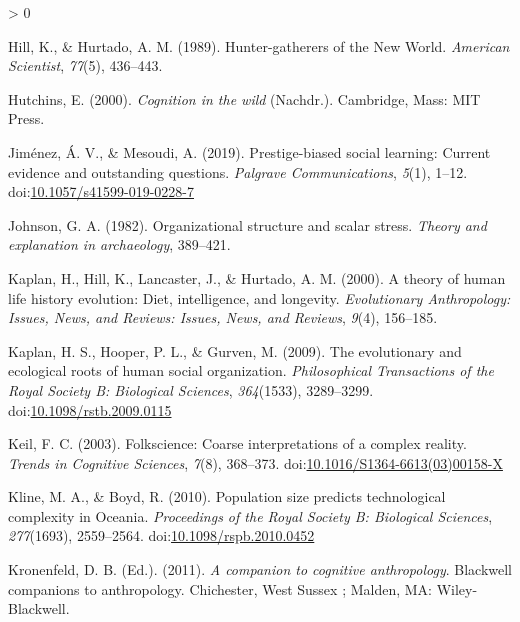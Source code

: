 \documentclass[
  11pt,
]{article}
\newlength{\cslhangindent}
\newenvironment{CSLReferences}[2] %
 {%
  \setlength{\parindent}{0pt}
  \ifodd #1 \everypar{\setlength{\hangindent}{\cslhangindent}}\ignorespaces\fi
  \ifnum #2 > 0
  \setlength{\parskip}{#2\baselineskip}
  \fi
 }%
 {}
\begin{document}
\begin{CSLReferences}{1}{0}
\leavevmode\hypertarget{ref-hillHuntergatherersNewWorld1989}{}%
Hill, K., \& Hurtado, A. M. (1989). Hunter-gatherers of the {New World}. \emph{American Scientist}, \emph{77}(5), 436--443.

\leavevmode\hypertarget{ref-hutchinsCognitionWild2000}{}%
Hutchins, E. (2000). \emph{Cognition in the wild} (Nachdr.). {Cambridge, Mass}: {MIT Press}.

\leavevmode\hypertarget{ref-jimenezPrestigebiasedSocialLearning2019}{}%
Jiménez, Á. V., \& Mesoudi, A. (2019). Prestige-biased social learning: Current evidence and outstanding questions. \emph{Palgrave Communications}, \emph{5}(1), 1--12. doi:\href{https://doi.org/10.1057/s41599-019-0228-7}{10.1057/s41599-019-0228-7}

\leavevmode\hypertarget{ref-johnson1982organizational}{}%
Johnson, G. A. (1982). Organizational structure and scalar stress. \emph{Theory and explanation in archaeology}, 389--421.

\leavevmode\hypertarget{ref-kaplanTheoryHumanLife2000}{}%
Kaplan, H., Hill, K., Lancaster, J., \& Hurtado, A. M. (2000). A theory of human life history evolution: {Diet}, intelligence, and longevity. \emph{Evolutionary Anthropology: Issues, News, and Reviews: Issues, News, and Reviews}, \emph{9}(4), 156--185.

\leavevmode\hypertarget{ref-kaplanEvolutionaryEcologicalRoots2009}{}%
Kaplan, H. S., Hooper, P. L., \& Gurven, M. (2009). The evolutionary and ecological roots of human social organization. \emph{Philosophical Transactions of the Royal Society B: Biological Sciences}, \emph{364}(1533), 3289--3299. doi:\href{https://doi.org/10.1098/rstb.2009.0115}{10.1098/rstb.2009.0115}

\leavevmode\hypertarget{ref-keilFolkscienceCoarseInterpretations2003}{}%
Keil, F. C. (2003). Folkscience: Coarse interpretations of a complex reality. \emph{Trends in Cognitive Sciences}, \emph{7}(8), 368--373. doi:\href{https://doi.org/10.1016/S1364-6613(03)00158-X}{10.1016/S1364-6613(03)00158-X}

\leavevmode\hypertarget{ref-klinePopulationSizePredicts2010}{}%
Kline, M. A., \& Boyd, R. (2010). Population size predicts technological complexity in {Oceania}. \emph{Proceedings of the Royal Society B: Biological Sciences}, \emph{277}(1693), 2559--2564. doi:\href{https://doi.org/10.1098/rspb.2010.0452}{10.1098/rspb.2010.0452}

\leavevmode\hypertarget{ref-kronenfeldCompanionCognitiveAnthropology2011}{}%
Kronenfeld, D. B. (Ed.). (2011). \emph{A companion to cognitive anthropology}. Blackwell companions to anthropology. {Chichester, West Sussex ; Malden, MA}: {Wiley-Blackwell}.


\end{CSLReferences}
\end{document}
